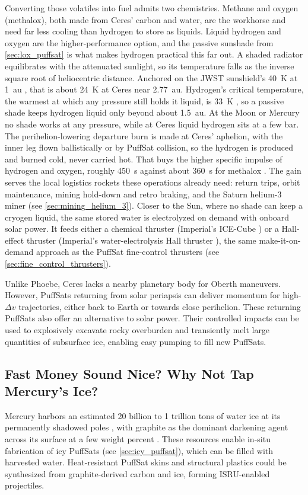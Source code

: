 \documentclass{article}
\newcommand{\deltav}{\Delta v}
\begin{document}
Converting those volatiles into fuel admits two chemistries. Methane and oxygen (methalox), both made from Ceres' carbon and water, are the workhorse and need far less cooling than hydrogen to store as liquids. Liquid hydrogen and oxygen are the higher-performance option, and the passive sunshade from \autoref{sec:lox_puffsat} is what makes hydrogen practical this far out. A shaded radiator equilibrates with the attenuated sunlight, so its temperature falls as the inverse square root of heliocentric distance. Anchored on the JWST sunshield's \SI{40}{\kelvin} at \SI{1}{\astronomicalunit} \cite{jwst_sunshield}, that is about \SI{24}{\kelvin} at Ceres near \SI{2.77}{\astronomicalunit}. Hydrogen's critical temperature, the warmest at which any pressure still holds it liquid, is \SI{33}{\kelvin} \cite{nist_webbook_hydrogen}, so a passive shade keeps hydrogen liquid only beyond about \SI{1.5}{\astronomicalunit}. At the Moon or Mercury no shade works at any pressure, while at Ceres liquid hydrogen sits at a few bar. The perihelion-lowering departure burn is made at Ceres' aphelion, with the inner leg flown ballistically or by PuffSat collision, so the hydrogen is produced and burned cold, never carried hot. That buys the higher specific impulse of hydrogen and oxygen, roughly \SI{450}{\second} against about \SI{360}{\second} for methalox \cite{sutton_rocket_propulsion}. The gain serves the local logistics rockets these operations already need: return trips, orbit maintenance, mining hold-down and retro braking, and the Saturn helium-3 miner (see \autoref{sec:mining_helium_3}). Closer to the Sun, where no shade can keep a cryogen liquid, the same stored water is electrolyzed on demand with onboard solar power. It feeds either a chemical thruster (Imperial's ICE-Cube \cite{imperial_ice_cube}) or a Hall-effect thruster (Imperial's water-electrolysis Hall thruster \cite{schwertheim2022wet_het}), the same make-it-on-demand approach as the PuffSat fine-control thrusters (see \autoref{sec:fine_control_thrusters}).

Unlike Phoebe, Ceres lacks a nearby planetary body for Oberth maneuvers. However, PuffSats returning from solar periapsis can deliver momentum for high-$\deltav$ trajectories, either back to Earth or towards close perihelion. These returning PuffSats also offer an alternative to solar power. Their controlled impacts can be used to explosively excavate rocky overburden and transiently melt large quantities of subsurface ice, enabling easy pumping to fill new PuffSats.

\subsection{Fast Money Sound Nice?  Why Not Tap Mercury's Ice?}
Mercury harbors an estimated 20 billion to 1 trillion tons of water ice at its permanently shadowed poles \cite{lawrence2013mercury_ice}, with graphite as the dominant darkening agent across its surface at a few weight percent \cite{peplowski2016mercury_carbon}. These resources enable in-situ fabrication of icy PuffSats (see \autoref{sec:icy_puffsat}), which can be filled with harvested water. Heat-resistant PuffSat skins and structural plastics could be synthesized from graphite-derived carbon and ice, forming ISRU-enabled projectiles.
\end{document}
